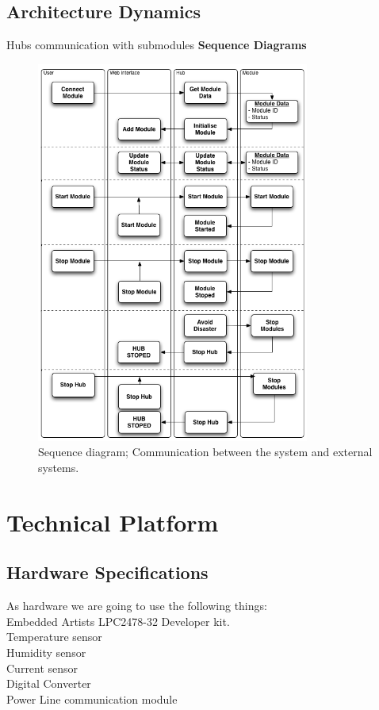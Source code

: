 	\subsection{Architecture Dynamics}
		Hubs communication with submodules
		\textbf{Sequence Diagrams}
		\begin{figure}[H]		%
			\begin{centering}
				 \includegraphics[width=0.8\textwidth]{images/SequenceDiagram.png}
				\caption{Sequence diagram; Communication between the system and external systems.}
		 	\end{centering}
		\end{figure}	
\section{Technical Platform}

	\subsection{Hardware Specifications}
	As hardware we are going to use the following things: 
	\\Embedded Artists LPC2478-32 Developer kit.
	\\Temperature sensor
	\\Humidity sensor
	\\Current sensor
	\\Digital Converter
	\\Power Line communication module
